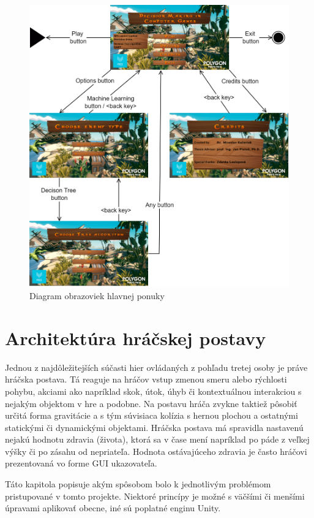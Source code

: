 \documentclass[slovak, master]{diploma}
\begin{document}
\begin{figure}[!htbp]
	\centering
	\includegraphics[width=.85\textwidth]{Figures/mainMenuScheme.png}
	\caption{Diagram obrazoviek hlavnej ponuky}
	\label{pic:MainMenuScheme}
\end{figure}

\chapter{Architektúra hráčskej postavy}
\label{sec:Player}
Jednou z najdôležitejších súčasti hier ovládaných z pohľadu tretej osoby je práve hráčska postava. Tá reaguje na hráčov vstup zmenou smeru alebo rýchlosti pohybu, akciami ako napríklad skok, útok, úhyb či kontextuálnou interakciou s nejakým objektom v hre a podobne. Na postavu hráča zvykne taktiež pôsobiť určitá forma gravitácie a s tým súvisiaca kolízia s hernou plochou a ostatnými statickými či dynamickými objektami. Hráčska postava má spravidla nastavenú nejakú hodnotu zdravia (života), ktorá sa v čase mení napríklad po páde z veľkej výšky či po zásahu od nepriateľa. Hodnota ostávajúceho zdravia je často hráčovi prezentovaná vo forme GUI ukazovateľa. 

Táto kapitola popisuje akým spôsobom bolo k jednotlivým problémom pristupované v tomto projekte. Niektoré princípy je možné s väčšími či menšími úpravami aplikovať obecne, iné sú poplatné enginu Unity. 
\end{document}
